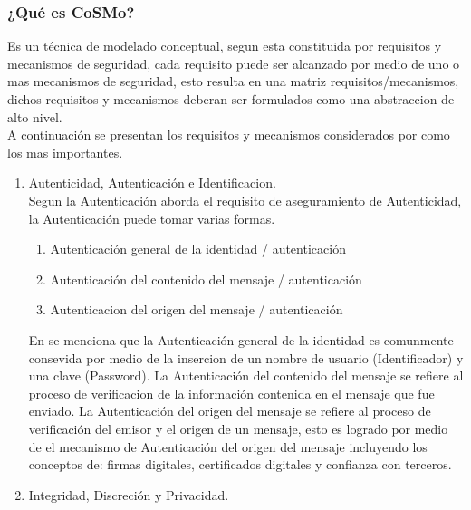 \documentclass[runningheads,a4paper]{llncs}
\begin{document}
\subsubsection{¿Qué es \gls{CoSMo}?}
Es un técnica de modelado conceptual, segun \cite{CoSMoIntroduction} esta constituida por requisitos y mecanismos de seguridad, cada requisito puede ser alcanzado por medio de uno o mas mecanismos de seguridad, esto resulta en una matriz requisitos/mecanismos, dichos requisitos y mecanismos deberan ser formulados como una abstraccion de alto nivel.\\

A continuación se presentan los requisitos y mecanismos considerados por \cite{CoSMoIntroduction} como los mas importantes.

\begin{enumerate}
	\item Autenticidad, Autenticación e Identificacion.\\
	
	Segun \cite{CoSMoIntroduction} la Autenticación aborda el requisito de aseguramiento de Autenticidad, la Autenticación puede tomar varias formas.
	
	\begin{enumerate}
		\item Autenticación general de la identidad / autenticación
		\item Autenticación del contenido del mensaje  / autenticación
		\item Autenticacion del origen del mensaje / autenticación\\
	\end{enumerate}
	
En \cite{CoSMoIntroduction} se menciona que la Autenticación general de la identidad es comunmente consevida por medio de la insercion de un nombre de usuario (\gls{Identificador}) y una clave (\gls{Password}). La Autenticación del contenido del mensaje se refiere al proceso de verificacion de la información contenida en el mensaje que fue enviado. La Autenticación del origen del mensaje se refiere al proceso de verificación del emisor y el origen de un mensaje, esto es logrado por medio de el mecanismo de Autenticación del origen del mensaje incluyendo los conceptos de: firmas digitales, certificados digitales y confianza con terceros.\\

	\item Integridad, Discreción y Privacidad.\\
	

\end{enumerate}
\end{document}
